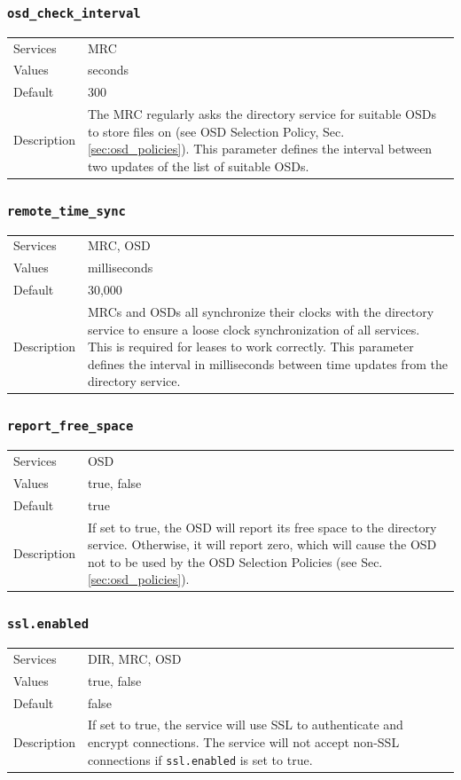 \documentclass[a4paper,10pt]{book}
\begin{document}
\subsubsection{\texttt{osd\_check\_interval}}
\begin{tabular}{lp{10cm}}
 Services & MRC\\
 Values   & seconds \\
 Default  & 300\\
 Description & The MRC regularly asks the directory service for suitable OSDs to store files on (see OSD Selection Policy, Sec. \ref{sec:osd_policies}). This parameter defines the interval between two updates of the list of suitable OSDs.
\end{tabular}

\subsubsection{\texttt{remote\_time\_sync}}
\begin{tabular}{lp{10cm}}
 Services & MRC, OSD\\
 Values   & milliseconds \\
 Default  & 30,000\\
 Description & MRCs and OSDs all synchronize their clocks with the directory service to ensure a loose clock synchronization of all services. This is required for leases to work correctly. This parameter defines the interval in milliseconds between time updates from the directory service.
\end{tabular}

\subsubsection{\texttt{report\_free\_space}}
\begin{tabular}{lp{10cm}}
 Services & OSD\\
 Values   & true, false\\
 Default  & true\\
 Description & If set to true, the OSD will report its free space to the directory service. Otherwise, it will report zero, which will cause the OSD not to be used by the OSD Selection Policies (see Sec. \ref{sec:osd_policies}).
\end{tabular}

\subsubsection{\texttt{ssl.enabled}}
\begin{tabular}{lp{10cm}}
 Services & DIR, MRC, OSD\\
 Values   & true, false \\
 Default  & false \\
 Description & If set to true, the service will use SSL to authenticate and encrypt connections. The service will not accept non-SSL connections if \texttt{ssl.enabled} is set to true.
\end{tabular}
\end{document}

